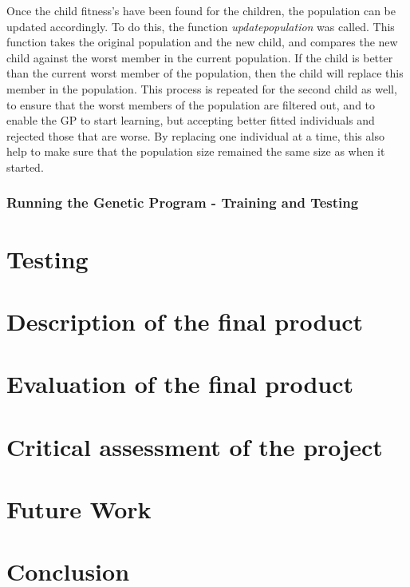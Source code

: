 \documentclass[11pt]{article}
\begin{document}
Once the child fitness's have been found for the children, the population can be updated accordingly. To do this, the function \textit{update\textunderscore population} was called. This function takes the original population and the new child, and compares the new child against the worst member in the current population. If the child is better than the current worst member of the population, then the child will replace this member in the population. This process is repeated for the second child as well, to ensure that the worst members of the population are filtered out, and to enable the GP to start learning, but accepting better fitted individuals and rejected those that are worse. By replacing one individual at a time, this also help to make sure that the population size remained the same size as when it started. 


\subsubsection{Running the Genetic Program - Training and Testing}

\newpage
\section{Testing}

\newpage
\section{Description of the final product}

\newpage
\section{Evaluation of the final product}

\newpage
\section{Critical assessment of the project }

\newpage
\section{Future Work}

\newpage
\section{Conclusion}
\end{document}
